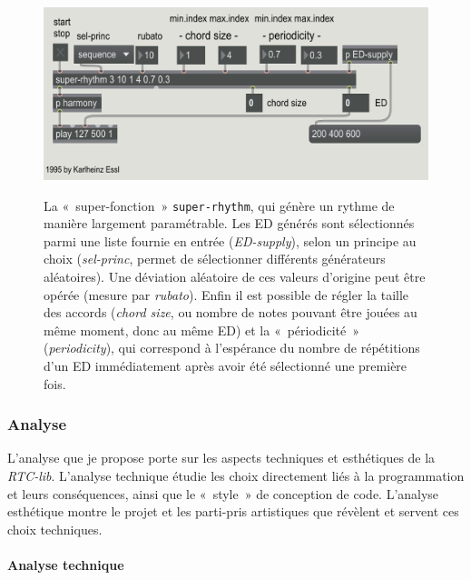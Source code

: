 \documentclass[a4paper,12pt]{article}
\newcommand{\guill}[1]{«~#1~»}
\begin{document}
\begin{figure}[h!]
\begin{center}
\includegraphics[width=\textwidth]{images/superrhythm.png}
\label{superrhythm}
\caption{La \guill{super-fonction} \texttt{super-rhythm}, qui génère un rythme de manière largement paramétrable. Les ED générés sont sélectionnés parmi une liste fournie en entrée (\emph{ED-supply}), selon un principe au choix (\emph{sel-princ}, permet de sélectionner différents générateurs aléatoires). Une déviation aléatoire de ces valeurs d'origine peut être opérée (mesure par \emph{rubato}). Enfin il est possible de régler la taille des accords (\emph{chord size}, ou nombre de notes pouvant être jouées au même moment, donc au même ED) et la \guill{périodicité} (\emph{periodicity}), qui correspond à l'espérance du nombre de répétitions d'un ED immédiatement après avoir été sélectionné une première fois.}
\end{center}
\end{figure}


\subsubsection{Analyse}

L'analyse que je propose porte sur les aspects techniques et esthétiques de la \emph{RTC-lib}. L'analyse technique étudie les choix directement liés à la programmation et leurs conséquences, ainsi que le \guill{style} de conception de code. L'analyse esthétique montre le projet et les parti-pris artistiques que révèlent et servent ces choix techniques.

\paragraph{Analyse technique \\}
\end{document}
